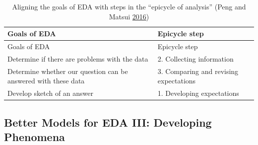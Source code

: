 \documentclass[
]{article}
\begin{document}
\begin{longtable}[]{@{}ll@{}}
\caption{Aligning the goals of EDA with steps in the ``epicycle of analysis'' (Peng and Matsui \protect\hyperlink{ref-PengArtDataScience2016}{2016})}\tabularnewline
\toprule
\begin{minipage}[b]{0.43\columnwidth}\raggedright
Goals of EDA\strut
\end{minipage} & \begin{minipage}[b]{0.24\columnwidth}\raggedright
Epicycle step\strut
\end{minipage}\tabularnewline
\midrule
\endfirsthead
\toprule
\begin{minipage}[b]{0.43\columnwidth}\raggedright
Goals of EDA\strut
\end{minipage} & \begin{minipage}[b]{0.24\columnwidth}\raggedright
Epicycle step\strut
\end{minipage}\tabularnewline
\midrule
\endhead
\begin{minipage}[t]{0.43\columnwidth}\raggedright
Determine if there are
problems with the data\strut
\end{minipage} & \begin{minipage}[t]{0.24\columnwidth}\raggedright
2. Collecting information\strut
\end{minipage}\tabularnewline
\begin{minipage}[t]{0.43\columnwidth}\raggedright
Determine whether our
question can be answered
with these data\strut
\end{minipage} & \begin{minipage}[t]{0.24\columnwidth}\raggedright
3. Comparing and revising expectations\strut
\end{minipage}\tabularnewline
\begin{minipage}[t]{0.43\columnwidth}\raggedright
Develop sketch of an
answer\strut
\end{minipage} & \begin{minipage}[t]{0.24\columnwidth}\raggedright
1. Developing expectations\strut
\end{minipage}\tabularnewline
\bottomrule
\end{longtable}

\hypertarget{better-models-for-eda-iii-developing-phenomena}{%
\subsection{Better Models for EDA III: Developing Phenomena}\label{better-models-for-eda-iii-developing-phenomena}}
\end{document}
